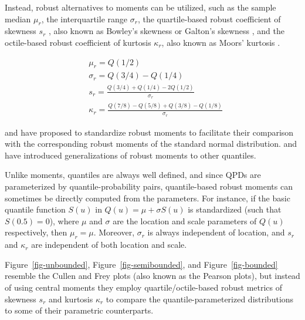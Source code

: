 \documentclass[
  fleqn,
  deca,
  blindrev
]{informs4}
\begin{document}
Instead, robust alternatives to moments can be utilized, such as the
sample median \(\mu_r\), the interquartile range \(\sigma_r\), the
quartile-based robust coefficient of skewness \(s_r\)
\citep{kim2004MoreRobustEstimation}, also known as Bowley's skewness
\citep{bowley1920ElementsStatistics} or Galton's skewness
\citep{gilchrist2000StatisticalModellingQuantile}, and the octile-based
robust coefficient of kurtosis \(\kappa_r\), also known as Moors'
kurtosis \citep{moors1988QuantileAlternativeKurtosis}.

\[
\begin{aligned}
&\mu_r=Q(1/2)\\
&\sigma_r=Q(3/4)-Q(1/4)\\
&s_r=\frac{Q(3/4)+Q(1/4)-2Q(1/2)}{\sigma_r}\\
&\kappa_r=\frac{Q(7/8)-Q(5/8)+Q(3/8)-Q(1/8)}{\sigma_r}
\end{aligned}
\]

\citet{kim2004MoreRobustEstimation} and
\citet{arachchige2022RobustAnalogsCoefficient} have proposed to
standardize robust moments to facilitate their comparison with the
corresponding robust moments of the standard normal distribution.
\citet{groeneveld1998ClassQuantileMeasures} and
\citet{jones2011SkewnessInvariantMeasuresKurtosis} have introduced
generalizations of robust moments to other quantiles.

Unlike moments, quantiles are always well defined, and since QPDs are
parameterized by quantile-probability pairs, quantile-based robust
moments can sometimes be directly computed from the parameters. For
instance, if the basic quantile function \(S(u)\) in
\(Q(u)=\mu+\sigma S(u)\) is standardized (such that \(S(0.5)=0\)), where
\(\mu\) and \(\sigma\) are the location and scale parameters of \(Q(u)\)
respectively, then \(\mu_r=\mu\). Moreover, \(\sigma_r\) is always
independent of location, and \(s_r\) and \(\kappa_r\) are independent of
both location and scale.

Figure~\ref{fig-unbounded}, Figure~\ref{fig-semibounded}, and
Figure~\ref{fig-bounded} resemble the Cullen and Frey
\citep{cullen1999ProbabilisticTechniquesExposure} plots (also known as
the Pearson plots), but instead of using central moments they employ
quartile/octile-based robust metrics of skewness \(s_r\) and kurtosis
\(\kappa_r\) to compare the quantile-parameterized distributions to some
of their parametric counterparts.
\end{document}
